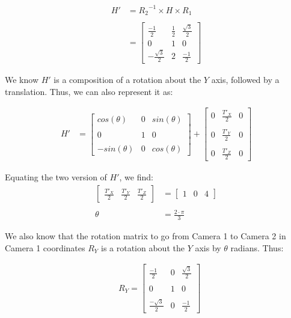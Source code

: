 \documentclass[12pt, oneside]{article}
\begin{document}
\begin{align*}
    H'  &= {R_2}^{-1} \times H \times R_1 \\ \\
        &=
        \begin{bmatrix} \frac{-1}{2}  & \frac{1}{2} & \frac{\sqrt{3}}{2} \\ 
            0   & 1 & 0 \\ 
            -\frac{\sqrt{3}}{2}  & 2 & \frac{-1}{2} \end{bmatrix} 
\end{align*}

We know $H'$ is a composition of a rotation about the $Y$ axis, followed by a 
translation. Thus, we can also represent it as:

\begin{align*}
    H'  &=
        \begin{bmatrix} cos(\theta)  & 0 & sin(\theta) \\ \\
            0  & 1 & 0 \\  \\
            -sin(\theta)   & 0 & cos(\theta) 
        \end{bmatrix} +
        \begin{bmatrix} 0  & \frac{T'_X}{2} & 0 \\ \\
            0  & \frac{T'_Y}{2} & 0 \\ \\
            0  & \frac{T'_Z}{2} & 0 
        \end{bmatrix} 
\end{align*}

Equating the two version of $H'$, we find:
\begin{align*}
    \begin{bmatrix} \frac{T'_X}{2} & \frac{T'_Y}{2} & \frac{T'_Z}{2} 
    \end{bmatrix}  &= 
    \begin{bmatrix} 1 & 0 & 4 
    \end{bmatrix} \\  \\
    \theta &= \frac{2 \cdot \pi }{3}
\end{align*}

We also know that the rotation matrix to go from Camera 1 to Camera 2 in Camera
1 coordinates $R_Y$ is a rotation about the $Y$ axis by $\theta$ radians. Thus:

\begin{align*}
    & R_Y =  
    \begin{bmatrix} \frac{-1}{2}  &  0 & \frac{\sqrt{3}}{2}\\ \\
         0   & 1 & 0 \\ \\
         \frac{-\sqrt{3}}{2}  &  0 & \frac{-1}{2}\end{bmatrix} 
\end{align*}
\end{document}
